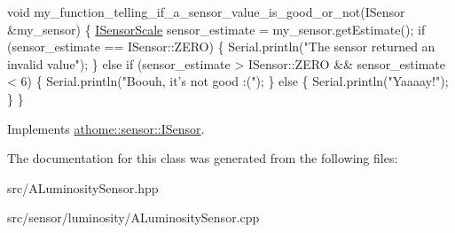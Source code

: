 \begin{DoxyCode}
\textcolor{keywordtype}{void} my\_function\_telling\_if\_a\_sensor\_value\_is\_good\_or\_not(ISensor
&my\_sensor) \{ \mbox{\hyperlink{classathome_1_1sensor_1_1_i_sensor_aa70bc27a4c17c86caf96cca776541ddf}{ISensorScale}} sensor\_estimate = my\_sensor.getEstimate(); \textcolor{keywordflow}{if}
(sensor\_estimate == ISensor::ZERO) \{ Serial.println(\textcolor{stringliteral}{"The sensor returned an}
\textcolor{stringliteral}{invalid value"});
  \}
  \textcolor{keywordflow}{else} \textcolor{keywordflow}{if} (sensor\_estimate > ISensor::ZERO && sensor\_estimate < 6) \{
    Serial.println(\textcolor{stringliteral}{"Boouh, it's not good :("});
  \}
  \textcolor{keywordflow}{else} \{
    Serial.println(\textcolor{stringliteral}{"Yaaaay!"});
  \}
\}
\end{DoxyCode}
 

Implements \mbox{\hyperlink{classathome_1_1sensor_1_1_i_sensor_af86df8538fecfcfc670b4adfbbde6abb}{athome\+::sensor\+::\+I\+Sensor}}.



The documentation for this class was generated from the following files\+:\begin{DoxyCompactItemize}
\item 
src/A\+Luminosity\+Sensor.\+hpp\item 
src/sensor/luminosity/A\+Luminosity\+Sensor.\+cpp\end{DoxyCompactItemize}
